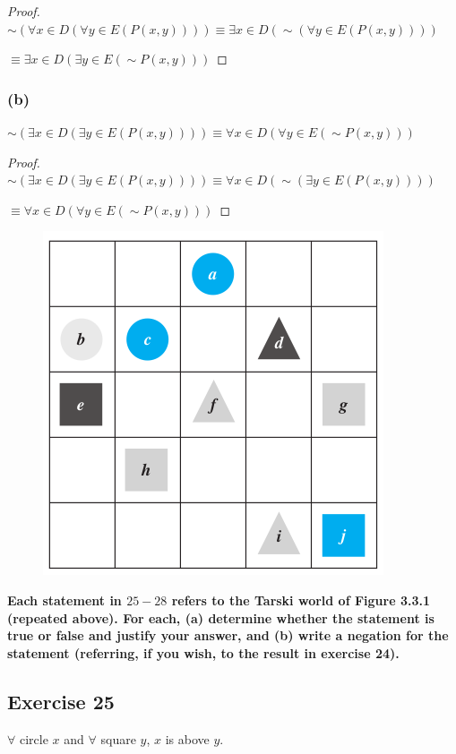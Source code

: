 \documentclass[14pt]{extarticle}
\newcommand{\fa}{\forall}
\newcommand{\te}{\exists}
\begin{document}
\begin{proof}
${\sim (\fa x \in D(\fa y \in E(P(x, y))))} \equiv \te x \in D({\sim (\fa y \in E(P(x, y)))})$ 

$\equiv \te x \in D(\te y \in E({\sim P(x, y)}))$
\end{proof}

\subsubsection{(b)}
$\sim(\te x \in D(\te y \in E(P(x, y)))) \equiv \fa x \in D(\fa y \in E({\sim P(x, y)}))$

\begin{proof}
${\sim (\te x \in D(\te y \in E(P(x, y))))} \equiv \fa x \in D({\sim (\te y \in E(P(x, y)))})$ 

$\equiv \fa x \in D(\fa y \in E({\sim P(x, y)}))$
\end{proof}

\begin{figure}[ht!]
\centering
\includegraphics[scale=0.4]{../images/3.3.1.png}
\end{figure}

{\bf \color{cyan} Each statement in $25-28$ refers to the Tarski world of Figure 3.3.1 (repeated above). For each, (a) determine whether the statement is true or false and justify your answer, and (b) write a negation for the statement (referring, if you wish, to the result in exercise 24).}

\subsection{Exercise 25}
$\fa$ circle $x$ and $\fa$ square $y$, $x$ is above $y$.
\end{document}
